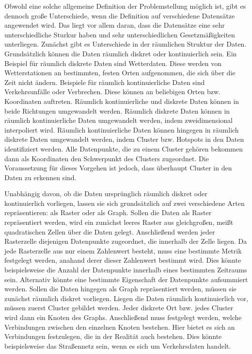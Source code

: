 Obwohl eine solche allgemeine Definition der Problemstellung möglich ist, gibt es dennoch große Unterschiede, wenn die Definition auf verschiedene Datensätze angewendet wird.
Das liegt vor allem daran, dass die Datensätze eine sehr unterschiedliche Sturkur haben und sehr unterschiedlichen Gesetzmäßigkeiten unterliegen.
Zunächst gibt es Unterschiede in der räumlichen Struktur der Daten.
Grundsätzlich können die Daten räumlich diskret oder kontinuierlich sein.
Ein Beispiel für räumlich diskrete Daten sind Wetterdaten.
Diese werden von Wetterstationen an bestimmten, festen Orten aufgenommen, die sich über die Zeit nicht ändern.
Beispiele für räumlich kontinuierliche Daten sind Verkehrsunfälle oder Verbrechen.
Diese können an beliebigen Orten bzw. Koordinaten auftreten.
Räumlich kontinuierliche und diskrete Daten können in beide Richtungen umgewandelt werden.
Räumlich diskrete Daten können in räumlich kontinuierliche Daten umgewandelt werden, indem zweidimensional interpoliert wird.
Räumlich kontinuierliche Daten können hingegen in räumlich diskrete Daten umgewandelt werden, indem Cluster bzw. Hotspots in den Daten identifiziert werden.
Alle Datenpunkte, die zu einem Cluster gehören bekommen dann als Koordinaten den Schwerpunkt des Clusters zugeordnet.
Die Voraussetzung für dieses Vorgehen ist jedoch, dass überhaupt Cluster in den Daten zu erkennen sind.

Unabhängig davon, ob die Daten ursprünglich räumlich diskret oder kontinuierlich vorliegen, lassen sie sich grundsätzlich auf zwei verschiedene Arten repräsentieren: als Raster oder als Graph.
Sollen die Daten als Raster repräsentiert werden, wird ein zunächst leeres Raster aus gleichgroßen, meißt quadratischen Zellen über die Daten gelegt.
Anschließend werden jeder Rasterzelle diejenigen Datenpunkte zugeordnet, die innerhalb der Zelle liegen.
Da jede Rasterzelle aus nur einem Zahlenwert besteht, muss eine bestimmte Metrik festgelegt werden, anahand derer dieser Zahlenwert bestimmt wird.
Dies könnte beispielsweise die Anzahl der Datenpunkte innerhalb eines bestimmten Zeitraums sein.
Alternativ könnte eine bestimmte Eigenschaft der Datenpunkte aufsummiert werden.
Sollen die Daten hingegen als Graph repräsentiert werden, müssen sie zunächst räumlich diskret vorliegen.
Liegen die Daten räumlich kontinuierlich vor, müssen zuerst Cluster gebildet werden.
Jeder diskrete Ort bzw. jedes Cluster wird dann ein Knoten des Graphs.
Anschließend muss festgelegt werden, welche Verbindungen zwischen den einzelnen Knoten bestehen.
Hier bietet es sich an Verbindungen festzulegen, die in der Realität auch bestehen.
Dies könnte beispielsweise das Straßennetz sein, wenn es sich um Verkehrsdaten handelt.

